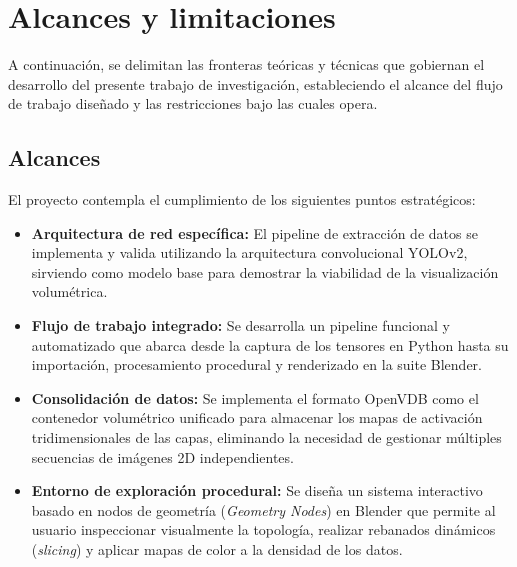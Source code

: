 \section{Alcances y limitaciones}

A continuación, se delimitan las fronteras teóricas y técnicas que gobiernan el desarrollo del presente trabajo de investigación, estableciendo el alcance del flujo de trabajo diseñado y las restricciones bajo las cuales opera.

\subsection{Alcances}
El proyecto contempla el cumplimiento de los siguientes puntos estratégicos:
\begin{itemize}
    \item \textbf{Arquitectura de red específica:} El pipeline de extracción de datos se implementa y valida 
    utilizando la arquitectura convolucional YOLOv2, sirviendo como modelo base para demostrar la viabilidad 
    de la visualización volumétrica.
    \item \textbf{Flujo de trabajo integrado:} Se desarrolla un pipeline funcional y automatizado que abarca 
    desde la captura de los tensores en Python hasta su importación, procesamiento procedural y renderizado en 
    la suite Blender.
    \item \textbf{Consolidación de datos:} Se implementa el formato OpenVDB como el contenedor volumétrico 
    unificado para almacenar los mapas de activación tridimensionales de las capas, eliminando la necesidad 
    de gestionar múltiples secuencias de imágenes 2D independientes.
    \item \textbf{Entorno de exploración procedural:} Se diseña un sistema interactivo basado en nodos de 
    geometría (\textit{Geometry Nodes}) en Blender que permite al usuario inspeccionar visualmente la 
    topología, realizar rebanados dinámicos (\textit{slicing}) y aplicar mapas de color a la densidad 
    de los datos.
\end{itemize}

